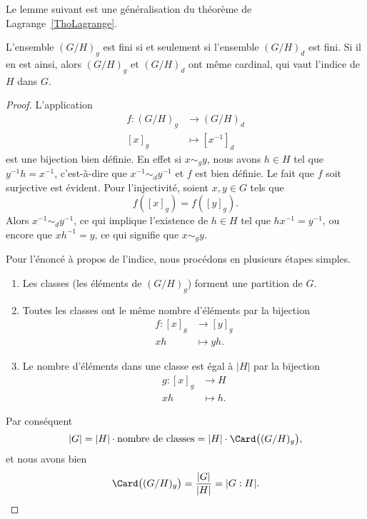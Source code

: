 Le lemme suivant est une généralisation du théorème de Lagrange~\ref{ThoLagrange}.

\begin{lemma}
	L'ensemble \( (G/H)_g\) est fini si et seulement si l'ensemble \( (G/H)_d\) est fini. Si il en est ainsi, alors \( (G/H)_g\) et \( (G/H)_d\) ont même cardinal, qui vaut l'indice de \( H\) dans \( G\).
\end{lemma}

\begin{proof}
	L'application
	\begin{equation}
		\begin{aligned}
			f\colon (G/H)_g & \to (G/H)_d        \\
			[x]_g           & \mapsto [x^{-1}]_d
		\end{aligned}
	\end{equation}
	est une bijection bien définie. En effet si \( x\sim_g y\), nous avons \( h\in H\) tel que \( y^{-1}h=x^{-1}\), c'est-à-dire que \( x^{-1}\sim_d y^{-1}\) et \( f\) est bien définie. Le fait que \( f\) soit surjective est évident. Pour l'injectivité, soient \( x, y \in G \) tels que
	\begin{equation}
		f([x]_g)=f([y]_g).
	\end{equation}
	Alors \( x^{-1}\sim_d y^{-1}\), ce qui implique l'existence de \( h\in H\) tel que \( hx^{-1}=y^{-1}\), ou encore que \( xh^{-1}=y\), ce qui signifie que \( x\sim_gy\).

	Pour l'énoncé à propos de l'indice, nous procédons en plusieurs étapes simples.
	\begin{enumerate}
		\item
		      Les classes (les éléments de \( (G/H)_g\)) forment une partition de \( G\).
		\item
		      Toutes les classes ont le même nombre d'éléments par la bijection
		      \begin{equation}
			      \begin{aligned}
				      f\colon [x]_g & \to [y]_g   \\
				      xh            & \mapsto yh.
			      \end{aligned}
		      \end{equation}
		\item
		      Le nombre d'éléments dans une classe est égal à \( | H |\) par la bijection
		      \begin{equation}
			      \begin{aligned}
				      g\colon [x]_g & \to H      \\
				      xh            & \mapsto h.
			      \end{aligned}
		      \end{equation}
	\end{enumerate}
	Par conséquent
	\begin{equation}
		| G |=| H |\cdot \text{nombre de classes}=| H | \cdot \Card\big(  (G/H)_g \big),
	\end{equation}
	et nous avons bien
	\begin{equation}
		\Card\big( (G/H)_g \big)   =\frac{ | G | }{ | H | }=| G:H |.
	\end{equation}
\end{proof}

